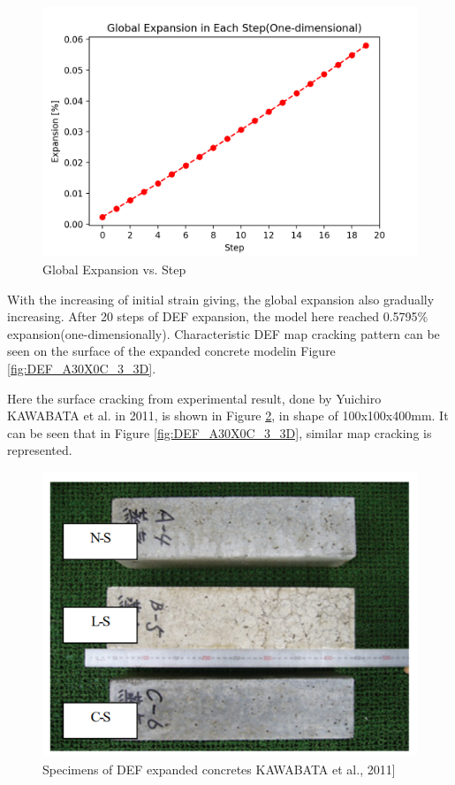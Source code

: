   \begin{figure}[ht!]
  \centering
  \includegraphics[width=.8\linewidth]{Files/exp_plot/DEFA30X0C_3_exp.png}
    \caption{Global Expansion vs. Step}
    \label{fig:DEFA30X0C_3_exp}
  \end{figure}

With the increasing of initial strain giving, the global expansion also gradually increasing. After 20 steps of DEF expansion, the model here reached 0.5795\% expansion(one-dimensionally). Characteristic DEF map cracking pattern can be seen on the surface of the expanded concrete modelin Figure \ref{fig:DEF_A30X0C_3_3D}.

Here the surface cracking from experimental result, done by Yuichiro KAWABATA et al\cite{KAWABATA}. in 2011, is shown in Figure \ref{DEFcrack}, in shape of 100x100x400mm.
It can be seen that in Figure \ref{fig:DEF_A30X0C_3_3D}, similar map cracking is represented.

  \begin{figure}[ht!]
  \centering
  \includegraphics[width=.8\linewidth]{Reference/DEFcrack.png}
    \caption{Specimens of DEF expanded concretes KAWABATA et al., 2011]}
    \label{DEFcrack}
  \end{figure}

